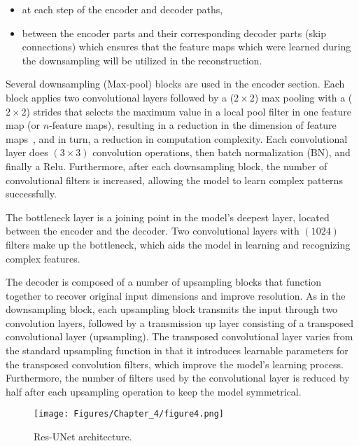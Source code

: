 \begin{itemize}
	\item at each step of the encoder and decoder paths,
	\item between the encoder parts and their corresponding decoder parts (skip connections) which ensures that the feature maps which were learned during the downsampling will be utilized in the reconstruction. 
\end{itemize}

Several downsampling (Max-pool) blocks are used in the encoder section.
Each block applies two convolutional layers followed by a (\(2\times2\)) max pooling with a (\(2\times2\)) strides that selects the maximum value in a local pool filter in one feature map (or \(n\)-feature maps), resulting in a reduction in the dimension of feature maps~\cite{Lecun2015}, and in turn, a reduction in computation complexity.
Each convolutional layer does \((3\times3)\) convolution operations, then batch normalization (BN), and finally a Relu.
Furthermore, after each downsampling block, the number of convolutional filters is increased, allowing the model to learn complex patterns successfully.

The bottleneck layer is a joining point in the model's deepest layer, located between the encoder and the decoder.
Two convolutional layers with \((1024)\) filters make up the bottleneck, which aids the model in learning and recognizing complex features.

The decoder is composed of a number of upsampling blocks that function together to recover original input dimensions and improve resolution.
As in the downsampling block, each upsampling block transmits the input through two convolution layers, followed by a transmission up layer consisting of a transposed convolutional layer (upsampling).
The transposed convolutional layer varies from the standard upsampling function in that it introduces learnable parameters for the transposed convolution filters, which improve the model's learning process.
Furthermore, the number of filters used by the convolutional layer is reduced by half after each upsampling operation to keep the model symmetrical.
\begin{figure} [h!]
	\begin{center}
		\texttt{[image: Figures/Chapter\_4/figure4.png]}
	\end{center}
	\caption{Res-UNet architecture.} 
	\label{fig:Unet}
\end{figure}
